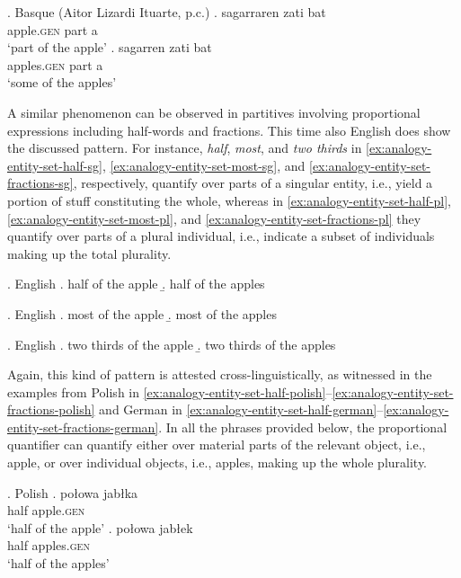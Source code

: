 \ex.\label{ex:analogy-entity-set-basque} Basque (Aitor Lizardi Ituarte, p.c.)
\ag. sagarraren zati bat\label{ex:analogy-entity-basque}\\
     apple\textsc{.gen} part   a\\
     `part of the apple'
\bg. sagarren    zati bat\label{ex:analogy-set-basque}\\
     apples\textsc{.gen} part a\\
     `some of the apples'
 
A similar phenomenon can be observed in partitives involving proportional expressions including half-words and fractions. This time also English does show the discussed pattern. For instance, \textit{half}, \textit{most}, and \textit{two thirds} in \ref{ex:analogy-entity-set-half-sg}, \ref{ex:analogy-entity-set-most-sg}, and \ref{ex:analogy-entity-set-fractions-sg}, respectively, quantify over parts of a singular entity, i.e., yield a portion of stuff constituting the whole, whereas in \ref{ex:analogy-entity-set-half-pl}, \ref{ex:analogy-entity-set-most-pl}, and \ref{ex:analogy-entity-set-fractions-pl} they quantify over parts of a plural individual, i.e., indicate a subset of individuals making up the total plurality.\largerpage[-3]

\ex.\label{ex:analogy-entity-set-half} English
\a. half of the apple\label{ex:analogy-entity-set-half-sg}
\b. half of the apples\label{ex:analogy-entity-set-half-pl}

\ex.\label{ex:analogy-entity-set-most} English
\a. most of the apple\label{ex:analogy-entity-set-most-sg}
\b. most of the apples\label{ex:analogy-entity-set-most-pl}

\ex.\label{ex:analogy-entity-set-fractions} English
\a. two thirds of the apple\label{ex:analogy-entity-set-fractions-sg}
\b. two thirds of the apples\label{ex:analogy-entity-set-fractions-pl} 

Again, this kind of pattern is attested cross-linguistically, as witnessed in the examples from Polish in \ref{ex:analogy-entity-set-half-polish}--\ref{ex:analogy-entity-set-fractions-polish} and German in \ref{ex:analogy-entity-set-half-german}--\ref{ex:analogy-entity-set-fractions-german}. In all the phrases provided below, the proportional quantifier can quantify either over material parts of the relevant object, i.e., apple, or over individual objects, i.e., apples, making up the whole plurality. 

\ex.\label{ex:analogy-entity-set-half-polish} Polish
\ag. połowa jabłka\label{ex:analogy-entity-set-half-polish-sg}\\
half apple\textsc{.gen}\\
`half of the apple'
\bg. połowa jabłek \label{ex:analogy-entity-set-half-polish-pl}\\
half apples\textsc{.gen}\\
`half of the apples'

